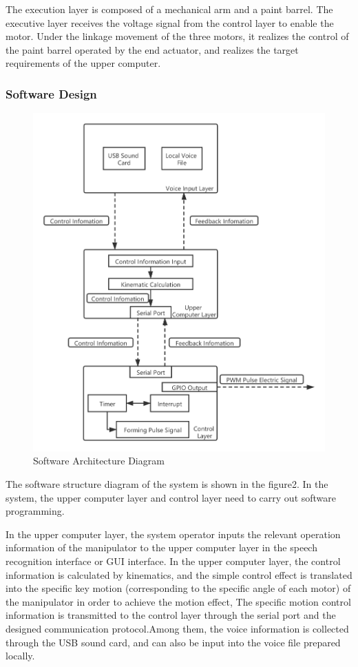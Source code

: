 \documentclass{hci}
\begin{document}
The execution layer is composed of a mechanical arm and a paint barrel. The executive layer receives the voltage signal from the control layer to enable the motor. Under the linkage movement of the three motors, it realizes the control of the paint barrel operated by the end actuator, and realizes the target requirements of the upper computer.

\subsubsection{Software Design}
\begin{figure}[htbp]
	\centering
	\includegraphics[width=1\linewidth]{figures/SA}
	\caption{Software Architecture Diagram}
	\label{fig:SA}
\end{figure}
The software structure diagram of the system is shown in the figure2. In the system, the upper computer layer and control layer need to carry out software programming.

In the upper computer layer, the system operator inputs the relevant operation information of the manipulator to the upper computer layer in the speech recognition interface or GUI interface. In the upper computer layer, the control information is calculated by kinematics, and the simple control effect is translated into the specific key motion (corresponding to the specific angle of each motor) of the manipulator in order to achieve the motion effect, The specific motion control information is transmitted to the control layer through the serial port and the designed communication protocol.Among them, the voice information is collected through the USB sound card, and can also be input into the voice file prepared locally.
\end{document}
